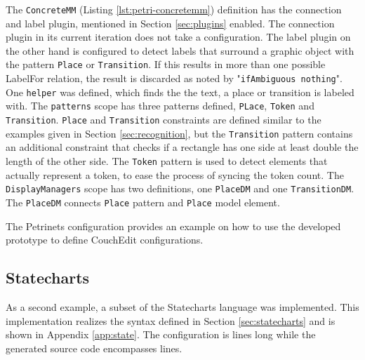 The \texttt{ConcreteMM} (Listing \ref{lst:petri-concretemm}) definition has the connection and label  plugin, mentioned in Section \ref{sec:plugins} enabled. The connection plugin in its current iteration does not take a configuration. The label plugin on the other hand is configured to detect labels that surround a graphic object with the pattern \texttt{Place} or \texttt{Transition}. If this results in more than one possible LabelFor relation, the result is discarded as noted by "\texttt{ifAmbiguous nothing}". One \texttt{helper} was defined, which finds the the text, a place or transition is labeled with. The \texttt{patterns} scope has three patterns defined, \texttt{PLace}, \texttt{Token} and \texttt{Transition}. \texttt{Place} and \texttt{Transition} constraints are defined similar to the examples given in Section \ref{sec:recognition}, but the \texttt{Transition} pattern contains an additional constraint that checks if a rectangle has one side at least double the length of the other side. The \texttt{Token} pattern is used to detect elements that actually represent a token, to ease the process of syncing the token count. The \texttt{DisplayManagers} scope has two definitions, one \texttt{PlaceDM} and one \texttt{TransitionDM}. The \texttt{PlaceDM} connects \texttt{Place} pattern and \texttt{Place} model element.

The Petrinets configuration provides an example on how to use the developed prototype to define CouchEdit configurations. 



\subsection{Statecharts}
\label{sec:state-impl}
As a second example, a subset of the Statecharts language was implemented. This implementation realizes the syntax defined in Section \ref{sec:statecharts} and is shown in Appendix \ref{app:state}. The configuration is \stateConfigLoC lines long while the generated source code encompasses \stateGeneratedLoC lines.

